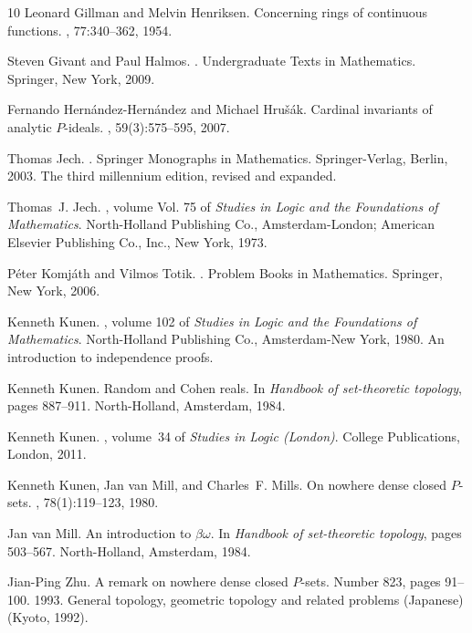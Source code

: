 \documentclass{article}%
\begin{document}
\begin{thebibliography}{10}
Leonard Gillman and Melvin Henriksen.
\newblock Concerning rings of continuous functions.
, 77:340--362, 1954.

Steven Givant and Paul Halmos.
.
\newblock Undergraduate Texts in Mathematics. Springer, New York, 2009.

Fernando Hern\'andez-Hern\'andez and Michael Hru{\v{s}}{\'a}k.
\newblock Cardinal invariants of analytic {$P$}-ideals.
, 59(3):575--595, 2007.

Thomas Jech.
.
\newblock Springer Monographs in Mathematics. Springer-Verlag, Berlin, 2003.
\newblock The third millennium edition, revised and expanded.

Thomas~J. Jech.
, volume Vol. 75 of {\em Studies in Logic
  and the Foundations of Mathematics}.
\newblock North-Holland Publishing Co., Amsterdam-London; American Elsevier
  Publishing Co., Inc., New York, 1973.

P\'{e}ter Komj\'{a}th and Vilmos Totik.
.
\newblock Problem Books in Mathematics. Springer, New York, 2006.

Kenneth Kunen.
, volume 102 of {\em Studies in Logic and the
  Foundations of Mathematics}.
\newblock North-Holland Publishing Co., Amsterdam-New York, 1980.
\newblock An introduction to independence proofs.

Kenneth Kunen.
\newblock Random and {C}ohen reals.
\newblock In {\em Handbook of set-theoretic topology}, pages 887--911.
  North-Holland, Amsterdam, 1984.

Kenneth Kunen.
, volume~34 of {\em Studies in Logic (London)}.
\newblock College Publications, London, 2011.

Kenneth Kunen, Jan van Mill, and Charles~F. Mills.
\newblock On nowhere dense closed {$P$}-sets.
, 78(1):119--123, 1980.

Jan van Mill.
\newblock An introduction to {$\beta\omega$}.
\newblock In {\em Handbook of set-theoretic topology}, pages 503--567.
  North-Holland, Amsterdam, 1984.

Jian-Ping Zhu.
\newblock A remark on nowhere dense closed {$P$}-sets.
\newblock Number 823, pages 91--100. 1993.
\newblock General topology, geometric topology and related problems (Japanese)
  (Kyoto, 1992).

\end{thebibliography}
\end{document}
